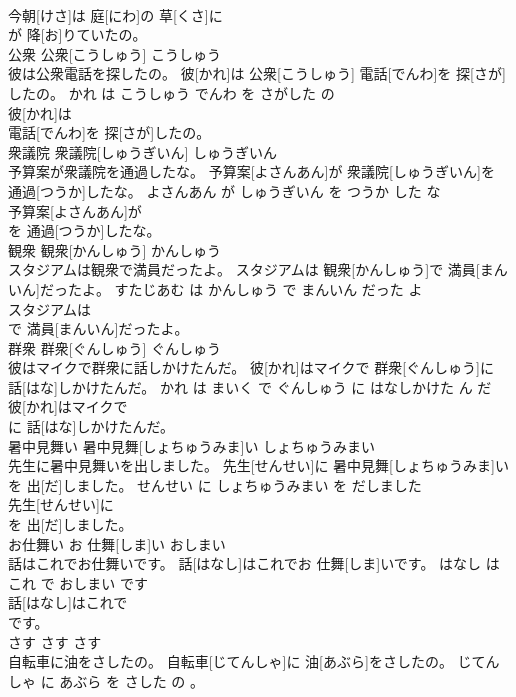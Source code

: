 \documentclass[8pt]{extreport}
\begin{document}
\begin{CJK}{UTF8}{min}
\\	今朝[けさ]は 庭[にわ]の 草[くさ]に
\\	が 降[お]りていたの。			
\\	公衆	公衆[こうしゅう]	こうしゅう	
\\	彼は公衆電話を探したの。	彼[かれ]は 公衆[こうしゅう] 電話[でんわ]を 探[さが]したの。	かれ は こうしゅう でんわ を さがした の	
\\	彼[かれ]は
\\	電話[でんわ]を 探[さが]したの。			
\\	衆議院	衆議院[しゅうぎいん]	しゅうぎいん	
\\	予算案が衆議院を通過したな。	予算案[よさんあん]が 衆議院[しゅうぎいん]を 通過[つうか]したな。	よさんあん が しゅうぎいん を つうか した な	
\\	予算案[よさんあん]が
\\	を 通過[つうか]したな。			
\\	観衆	観衆[かんしゅう]	かんしゅう	
\\	スタジアムは観衆で満員だったよ。	スタジアムは 観衆[かんしゅう]で 満員[まんいん]だったよ。	すたじあむ は かんしゅう で まんいん だった よ	
\\	スタジアムは
\\	で 満員[まんいん]だったよ。			
\\	群衆	群衆[ぐんしゅう]	ぐんしゅう	
\\	彼はマイクで群衆に話しかけたんだ。	彼[かれ]はマイクで 群衆[ぐんしゅう]に 話[はな]しかけたんだ。	かれ は まいく で ぐんしゅう に はなしかけた ん だ	
\\	彼[かれ]はマイクで
\\	に 話[はな]しかけたんだ。			
\\	暑中見舞い	暑中見舞[しょちゅうみま]い	しょちゅうみまい	
\\	先生に暑中見舞いを出しました。	先生[せんせい]に 暑中見舞[しょちゅうみま]いを 出[だ]しました。	せんせい に しょちゅうみまい を だしました	
\\	先生[せんせい]に
\\	を 出[だ]しました。			
\\	お仕舞い	お 仕舞[しま]い	おしまい	
\\	話はこれでお仕舞いです。	話[はなし]はこれでお 仕舞[しま]いです。	はなし は これ で おしまい です	
\\	話[はなし]はこれで
\\	です。			
\\	さす	さす	さす	
\\	自転車に油をさしたの。	自転車[じてんしゃ]に 油[あぶら]をさしたの。	じてんしゃ に あぶら を さした の 。	

\end{CJK}
\end{document}
